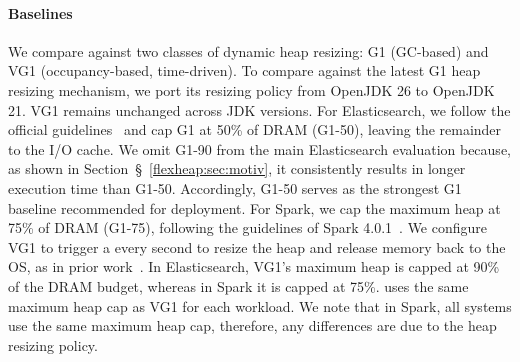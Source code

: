 \paragraph{\textbf{Baselines}}
We compare \flexheapName{} against two classes of dynamic heap resizing: G1 (GC-based) and VG1 (occupancy-based, time-driven).
To compare against the latest G1 heap resizing mechanism, we port its resizing policy from OpenJDK 26 to OpenJDK 21.
VG1 remains unchanged across JDK versions.
For Elasticsearch, we follow the official guidelines~\cite{elasticsearch:guidelines} and cap G1 at 50\% of DRAM (G1-50), leaving the remainder to the I/O cache.
We omit G1-90 from the main Elasticsearch evaluation because, as shown in Section~\S~\ref{flexheap:sec:motiv}, it consistently results in longer execution time than G1-50.
Accordingly, G1-50 serves as the strongest G1 baseline recommended for deployment.
For Spark, we cap the maximum heap at 75\% of DRAM (G1-75), following the guidelines of Spark 4.0.1~\cite{spark:guidelines}.
We configure VG1 to trigger a \flexheapGC{} every second to resize the heap and release memory back to the OS, as in prior work~\cite{bruno:resize}.
In Elasticsearch, VG1’s maximum heap is capped at 90\% of the DRAM budget, whereas in Spark it is capped at 75\%.
\flexheapName{} uses the same maximum heap cap as VG1 for each workload.
We note that in Spark, all systems use the same maximum heap cap, therefore, any differences are due to the heap resizing policy.
